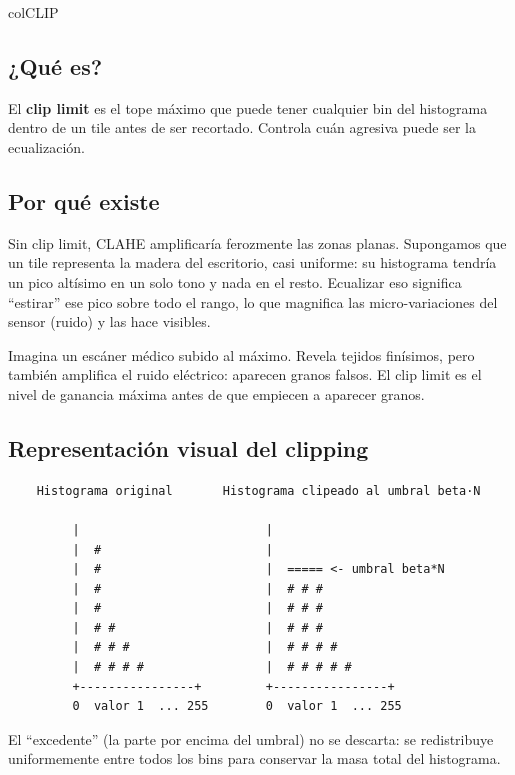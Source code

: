 \documentclass[11pt,a4paper]{article}
\begin{document}
\begin{keybox}{colCLIP}

\subsection*{¿Qué es?}

El \textbf{clip limit} es el tope máximo que puede tener cualquier bin del
histograma dentro de un tile antes de ser recortado. Controla cuán agresiva
puede ser la ecualización.

\subsection*{Por qué existe}

Sin clip limit, CLAHE amplificaría ferozmente las zonas planas. Supongamos
que un tile representa la madera del escritorio, casi uniforme: su histograma
tendría un pico altísimo en un solo tono y nada en el resto. Ecualizar eso
significa ``estirar'' ese pico sobre todo el rango, lo que magnifica las
micro-variaciones del sensor (ruido) y las hace visibles.

\begin{analogy}
Imagina un escáner médico subido al máximo. Revela tejidos finísimos, pero
también amplifica el ruido eléctrico: aparecen granos falsos. El clip limit
es el nivel de ganancia máxima antes de que empiecen a aparecer granos.
\end{analogy}

\subsection*{Representación visual del clipping}

\begin{verbatim}
    Histograma original       Histograma clipeado al umbral beta·N

         |                          |
         |  #                       |
         |  #                       |  ===== <- umbral beta*N
         |  #                       |  # # #
         |  #                       |  # # #
         |  # #                     |  # # #
         |  # # #                   |  # # # #
         |  # # # #                 |  # # # # #
         +----------------+         +----------------+
         0  valor 1  ... 255        0  valor 1  ... 255
\end{verbatim}

El ``excedente'' (la parte por encima del umbral) no se descarta: se
redistribuye uniformemente entre todos los bins para conservar la masa total
del histograma.


\end{keybox}
\end{document}
